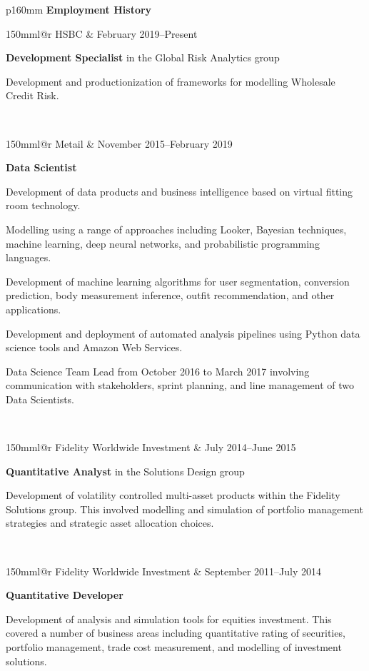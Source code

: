 \documentclass[10pt,a4paper]{article}
\makeatletter
\newcommand{\role}[6]{
\begin{tabular*}{150mm}{l@{\extracolsep{\fill}}r}
#5 & #1--#2 \\ 
\multicolumn{2}{p{145mm}}
{\textbf{#3}#4

{\small #6}} 
\end{tabular*}
\vspace{2mm}
 }
\makeatother
\begin{document}
\begin{tabular}{p{160mm}}
  {\large \textbf{Employment History}}\\
  \hline
  \role{February 2019}{Present}{Development Specialist}{ in the Global Risk Analytics group}{HSBC}
  {Development and productionization of frameworks for modelling Wholesale Credit Risk.
  }\\
  \role{November 2015}{February 2019}{Data Scientist}{}{Metail} 
  {Development of data products and business intelligence based on virtual fitting room technology.

   Modelling using a range of approaches including Looker, Bayesian techniques, 
   machine learning, deep neural networks, and probabilistic programming languages.

   Development of machine learning algorithms for user segmentation,
   conversion prediction, body measurement inference, outfit recommendation, and other applications.

   Development and deployment of automated analysis pipelines using Python data science tools
   and Amazon Web Services.

   Data Science Team Lead from October 2016 to
   March 2017 involving communication with stakeholders, sprint planning, 
   and line management of two Data Scientists.
  }\\
  \role{July 2014}{June 2015}{Quantitative Analyst}{ in the Solutions Design
  group}{Fidelity Worldwide Investment}
  {Development of volatility controlled multi-asset products 
  within the Fidelity Solutions group. This
  involved modelling and simulation of portfolio management
  strategies and strategic asset allocation choices.}\\
  \role{September 2011}{July 2014}{Quantitative Developer}{}
    {Fidelity Worldwide Investment}
    {Development of analysis and simulation tools for equities investment. This
    covered a number of business areas including quantitative rating of
    securities, portfolio management, trade cost measurement, and
    modelling of investment solutions.

}
\end{tabular}
\end{document}
